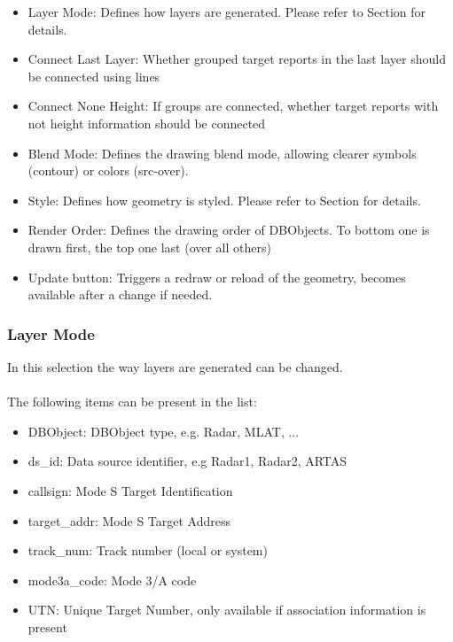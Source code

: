 \begin{itemize}
 \item Layer Mode: Defines how layers are generated. Please refer to Section  for details.
 \item Connect Last Layer: Whether grouped target reports in the last layer should be connected using lines
 \item Connect None Height: If groups are connected, whether target reports with not height information should be connected
 \item Blend Mode: Defines the drawing blend mode, allowing clearer symbols (contour) or colors (src-over).
 \item Style: Defines how geometry is styled. Please refer to Section  for details.
 \item Render Order: Defines the drawing order of DBObjects. To bottom one is drawn first, the top one last (over all others)
 \item Update button: Triggers a redraw or reload of the geometry, becomes available after a change if needed.
\end{itemize} 

\subsubsection{Layer Mode}
\label{sec:layer_mode}

In this selection the way layers are generated can be changed. \\\\

The following items can be present in the list:\\

\begin{itemize}
 \item DBObject: DBObject type, e.g. Radar, MLAT, ...
 \item ds\_id: Data source identifier, e.g Radar1, Radar2, ARTAS
 \item callsign: Mode S Target Identification
 \item target\_addr: Mode S Target Address
 \item track\_num: Track number (local or system)
 \item mode3a\_code: Mode 3/A code
 \item UTN: Unique Target Number, only available if association information is present
\end{itemize}
\ \\

